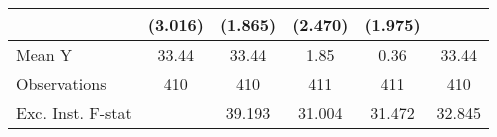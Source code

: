 {\begin{tabular}{l*{5}{c}}
            &     (3.016)         &     (1.865)         &     (2.470)         &     (1.975)         &                     \\
\midrule
Mean Y      &       33.44         &       33.44         &        1.85         &        0.36         &       33.44         \\
Observations&         410         &         410         &         411         &         411         &         410         \\
Exc. Inst. F-stat&                     &      39.193         &      31.004         &      31.472         &      32.845         \\
\bottomrule
\end{tabular}
}

